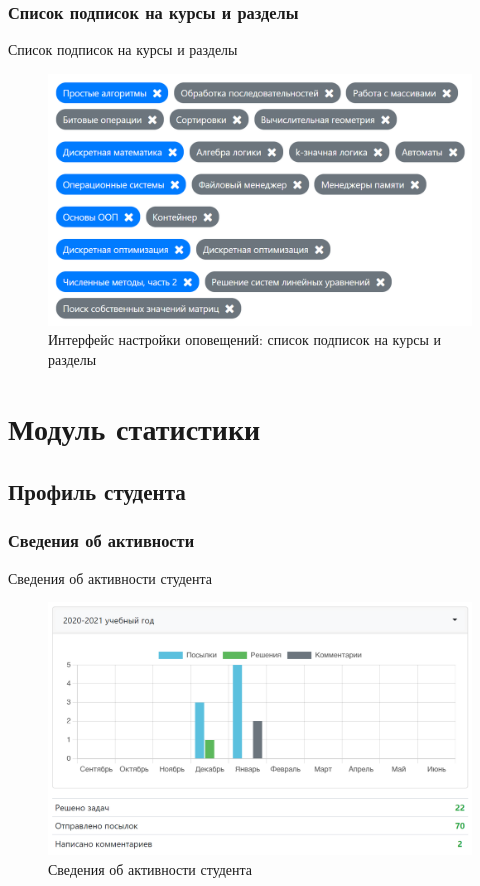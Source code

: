 \documentclass[10pt,pdf,hyperref={unicode}]{beamer}
\begin{document}
\subsubsection{Список подписок на курсы и разделы}
\begin{frame}{Список подписок на курсы и разделы}
    \begin{figure}
        \includegraphics[scale=0.25]{courses-contests-subscriptions}
        \caption{Интерфейс настройки оповещений: список подписок на курсы и разделы}
        \centering
    \end{figure}
\end{frame}

\section{Модуль статистики}
\subsection{Профиль студента}
\subsubsection{Сведения об активности}
\begin{frame}{Сведения об активности студента}
    \begin{figure}
        \includegraphics[scale=0.25]{account-activity}
        \caption{Сведения об активности студента}
        \centering
    \end{figure}
\end{frame}
\end{document}
